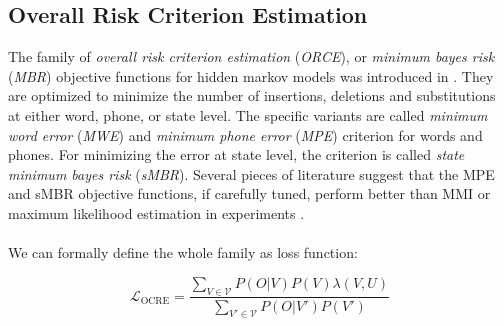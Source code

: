 \subsection{Overall Risk Criterion Estimation}
\label{sec:ocre}
The family of \textit{overall risk criterion estimation} (\textit{ORCE}), or \textit{minimum bayes risk} (\textit{MBR}) objective functions for hidden markov models was introduced in \cite{kaiser2000novel}. They are optimized to minimize the number of insertions, deletions and substitutions at either word, phone, or state level. The specific variants are called \textit{minimum word error} (\textit{MWE}) and \textit{minimum phone error} (\textit{MPE}) criterion for words and phones. For minimizing the error at state level, the criterion is called \textit{state minimum bayes risk} (\textit{sMBR}). Several pieces of literature suggest that the MPE and sMBR objective functions, if carefully tuned, perform better than MMI or maximum likelihood estimation in experiments \cite{povey2002minimum}\cite{gibson2008minimum}\cite{povey2005discriminative}\cite{peddinti2015jhu}. \\ \\
We can formally define the whole family as loss function: 

\[
\mathcal{L}_{\text{OCRE}} = \frac{\sum_{V \in \mathcal{V}} P(O|V)P(V) \lambda(V,U)}{\sum_{V' \in \mathcal{V}} P(O|V')P(V')} 
\]

